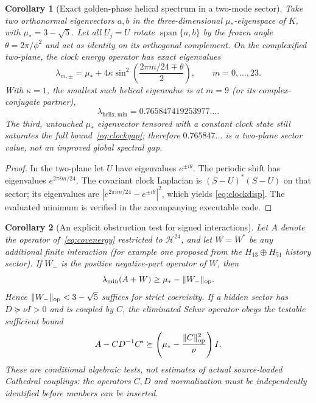 \documentclass[11pt,a4paper]{article}
\newtheorem{corollary}{Corollary}
\begin{document}
\begin{corollary}[Exact golden-phase helical spectrum in a two-mode sector]
\label{cor:golden}
Take two orthonormal eigenvectors $a,b$ in the three-dimensional
$\mu_*$-eigenspace of $K$, with $\mu_*=3-\sqrt5$.
Let all $U_j=U$ rotate $\operatorname{span}\{a,b\}$ by the frozen
angle $\theta=2\pi/\phi^2$ and act as identity on its orthogonal
complement. On the complexified two-plane, the clock energy operator has
exact eigenvalues
\begin{equation}\label{eq:clockdisp}
\lambda_{m,\pm}=\mu_*+
4\kappa\sin^2\!\left(\frac{2\pi m/24\mp\theta}{2}\right),
\qquad m=0,\ldots,23.
\end{equation}
With $\kappa=1$, the smallest such helical eigenvalue is at $m=9$
(or its complex-conjugate partner),
\[
\lambda_{\mathrm{helix,min}}=0.765847419253977\ldots .
\]
The third, untouched $\mu_*$ eigenvector tensored with a constant
clock state still saturates the \emph{full} bound~\eqref{eq:clockgap};
therefore $0.765847\ldots$ is a \emph{two-plane sector} value, not
an improved global spectral gap.
\end{corollary}
\begin{proof}
In the two-plane let $U$ have eigenvalues $e^{\pm i\theta}$.
The periodic shift has eigenvalues $e^{2\pi im/24}$.
The covariant clock Laplacian is $(S-U)^{\!*}(S-U)$ on that sector;
its eigenvalues are
$|e^{2\pi im/24}-e^{\pm i\theta}|^2$, which yields
\eqref{eq:clockdisp}. The evaluated minimum is verified in the
accompanying executable code.
\end{proof}

\begin{corollary}[An explicit obstruction test for signed interactions]
\label{cor:signed}
Let $A$ denote the operator of~\eqref{eq:covenergy}
restricted to $\mathcal H^{24}$, and let $W=W^{\!*}$ be any additional
finite interaction (for example one proposed from the $H_{13}\oplus
H_{51}$ history sector). If $W_-$ is the positive negative-part
operator of $W$, then
\[
\lambda_{\min}(A+W)\ge \mu_*-\|W_-\|_{\rm op}.
\]
Hence $\|W_-\|_{\rm op}<3-\sqrt5$ suffices for strict coercivity.
If a hidden sector has $D\succeq\nu I>0$ and is coupled by $C$,
the eliminated Schur operator obeys the testable sufficient bound
\[
A-CD^{-1}C^{\!*}\succeq
\left(\mu_*-\frac{\|C\|_{\rm op}^2}{\nu}\right)I.
\]
These are \emph{conditional algebraic tests}, not estimates of actual
source-loaded Cathedral couplings: the operators $C,D$ and normalization
must be independently identified before numbers can be inserted.
\end{corollary}
\end{document}
